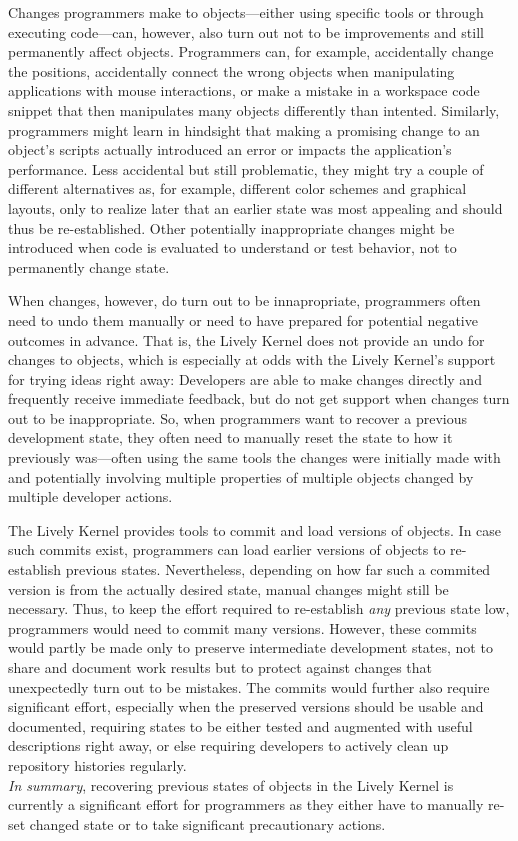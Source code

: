 Changes programmers make to objects---either using specific tools or through executing code---can, however, also turn out not to be improvements and still permanently affect objects.
Programmers can, for example, accidentally change the positions, accidentally connect the wrong objects when manipulating applications with mouse interactions, or make a mistake in a workspace code snippet that then manipulates many objects differently than intented.
Similarly, programmers might learn in hindsight that making a promising change to an object's scripts actually introduced an error or impacts the application's performance.
Less accidental but still problematic, they might try a couple of different alternatives as, for example, different color schemes and graphical layouts, only to realize later that an earlier state was most appealing and should thus be re-established.
Other potentially inappropriate changes might be introduced when code is evaluated to understand or test behavior, not to permanently change state.

When changes, however, do turn out to be innapropriate, programmers often need to undo them manually or need to have prepared for potential negative outcomes in advance.
That is, the Lively Kernel does not provide an undo for changes to objects, which is especially at odds with the Lively Kernel's support for trying ideas right away: Developers are able to make changes directly and frequently receive immediate feedback, but do not get support when changes turn out to be inappropriate.
So, when programmers want to recover a previous development state, they often need to manually reset the state to how it previously was---often using the same tools the changes were initially made with and potentially involving multiple properties of multiple objects changed by multiple developer actions.

The Lively Kernel provides tools to commit and load versions of objects.
In case such commits exist, programmers can load earlier versions of objects to re-establish previous states.
Nevertheless, depending on how far such a commited version is from the actually desired state, manual changes might still be necessary.
Thus, to keep the effort required to re-establish \emph{any} previous state low, programmers would need to commit many versions.
However, these commits would partly be made only to preserve intermediate development states, not to share and document work results but to protect against changes that unexpectedly turn out to be mistakes.
The commits would further also require significant effort, especially when the preserved versions should be usable and documented, requiring states to be either tested and augmented with useful descriptions right away, or else requiring developers to actively clean up repository histories regularly.\\
\emph{In summary}, recovering previous states of objects in the Lively Kernel is currently a significant effort for programmers as they either have to manually re-set changed state or to take significant precautionary actions.\\

